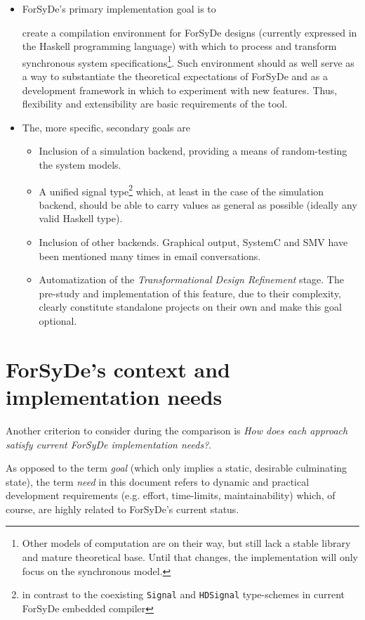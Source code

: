 \documentclass[a4paper,twoside,11pt]{article}
\begin{document}
 
\begin{itemize}
  \item ForSyDe's primary implementation goal is to 

    create a compilation environment for ForSyDe designs (currently expressed
    in the Haskell programming language) with which to process and transform
    synchronous system specifications\footnote{Other models of computation are
      on their way, but still lack a stable library and mature theoretical
      base. Until that changes, the implementation will only focus on the
      synchronous model.}. Such environment should as well serve as a way to
    substantiate the theoretical expectations of ForSyDe and as a development
    framework in which to experiment with new features. Thus, flexibility and
    extensibility are basic requirements of the tool.
  \item The, more specific, secondary goals are
    \begin{itemize}
    \item Inclusion of a simulation backend, providing a means of random-testing
      the system models.
    \item A unified signal type\footnote{in contrast to the coexisting
        \texttt{Signal} and \texttt{HDSignal} type-schemes in current ForSyDe
        embedded compiler} which, at least in the case of the simulation
      backend, should be able to carry values as general as possible (ideally
      any valid Haskell type).
    \item Inclusion of other backends. Graphical output, SystemC and SMV have
      been mentioned many times in email conversations.
    \item Automatization of the \textit{Transformational Design Refinement}
      stage. The pre-study and implementation of this feature, due to their
      complexity, clearly constitute standalone projects on their own and
      make this goal optional.
    \end{itemize}
\end{itemize}

\section{ForSyDe's context and implementation needs}

Another criterion to consider during the comparison is \textit{How does each
  approach satisfy current ForSyDe implementation needs?}. 

As opposed to the term \textit{goal} (which only implies a static, desirable
culminating state), the term \textit{need} in this document refers to dynamic
and practical development requirements (e.g. effort, time-limits,
maintainability) which, of course, are highly related to ForSyDe's current
status.
\end{document}

